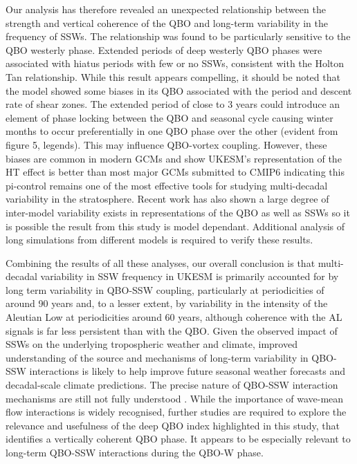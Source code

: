 \documentclass[wcd, manuscript]{copernicus}
\begin{document}
Our analysis has therefore revealed an unexpected relationship between the strength and vertical coherence of the QBO and long-term variability in the frequency of SSWs. The relationship was found to be particularly sensitive to the QBO westerly phase. Extended periods of deep westerly QBO phases were associated with hiatus periods with few or no SSWs, consistent with the Holton Tan relationship. While this result appears compelling, it should be noted that the model showed some biases in its QBO associated with the period and descent rate of shear zones. The extended period of close to 3 years could introduce an element of phase locking between the QBO and seasonal cycle causing winter months to occur preferentially in one QBO phase over the other (evident from figure 5, legends). This may influence QBO-vortex coupling. However, these biases are common in modern GCMs \citep{Bushell2020} and \cite{Rao2020} show UKESM's representation of the HT effect is better than most major GCMs submitted to CMIP6 indicating this pi-control remains one of the most effective tools for studying multi-decadal variability in the stratosphere.
Recent work has also shown a large degree of inter-model variability exists in representations of the QBO as well as SSWs \citep{Bushell2020,Ayarz2020} so it is possible the result from this study is model dependant. Additional analysis of long simulations from different models is required to verify these results. 

Combining the results of all these analyses, our overall  conclusion is that multi-decadal variability in SSW frequency in UKESM is primarily accounted for by long term variability in QBO-SSW coupling, particularly at periodicities of around 90 years and, to a lesser extent, by variability in the intensity of the Aleutian Low at periodicities around 60 years, although coherence with the AL signals is far less persistent than with the QBO. Given the observed impact of SSWs on the underlying tropospheric weather and climate, improved understanding of the source and mechanisms of long-term variability in QBO-SSW interactions is likely to help improve future seasonal weather forecasts and decadal-scale climate predictions. The precise nature of QBO-SSW interaction mechanisms are still not fully understood \citep{Anstey2014}. While the importance of wave-mean flow interactions is widely recognised, further studies are required to explore the relevance and usefulness of the deep QBO index highlighted in this study, that identifies a vertically coherent QBO phase. It appears to be especially relevant to long-term QBO-SSW interactions during the QBO-W phase. 
\end{document}
